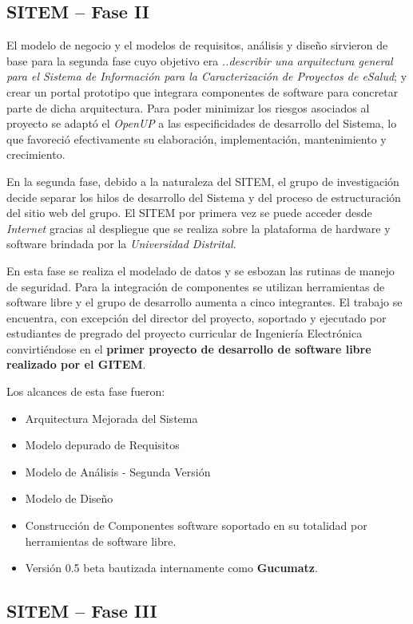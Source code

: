 \subsection{SITEM – Fase II}

El modelo de negocio y el modelos de requisitos, análisis y diseño sirvieron de base para la segunda fase cuyo objetivo era \textit{..describir una arquitectura general para el Sistema de Información para la Caracterización de Proyectos de eSalud}; y crear un portal prototipo que integrara componentes de software para concretar parte de dicha arquitectura. Para poder minimizar los riesgos asociados al proyecto se adaptó el \textit{OpenUP} a las especificidades de desarrollo del Sistema, lo que favoreció efectivamente su elaboración, implementación, mantenimiento y crecimiento.

En la segunda fase, debido a la naturaleza del SITEM, el grupo de investigación decide separar los hilos de desarrollo del Sistema y del proceso de estructuración del sitio web del grupo. El SITEM por primera vez se puede acceder desde \textit{Internet} gracias al despliegue que se realiza sobre la plataforma de hardware y software brindada por la \textit{Universidad Distrital}. 

En esta fase se realiza el modelado de datos y se esbozan las rutinas de manejo de seguridad. Para la integración de componentes se utilizan herramientas de software libre y el grupo de desarrollo aumenta a cinco integrantes. El trabajo se encuentra, con excepción del director del proyecto, soportado y ejecutado por estudiantes de pregrado del proyecto curricular de Ingeniería Electrónica convirtiéndose en el \textbf{primer proyecto de desarrollo de software libre realizado por el GITEM}.

Los alcances de esta fase fueron:
\begin{itemize}
\item Arquitectura Mejorada del Sistema
\item Modelo depurado de Requisitos
\item Modelo de Análisis - Segunda Versión
\item Modelo de Diseño
\item Construcción de Componentes software soportado en su totalidad por herramientas de software libre.
\item Versión 0.5 beta bautizada internamente como \textbf{Gucumatz}.
\end{itemize}


\subsection{SITEM – Fase III}

